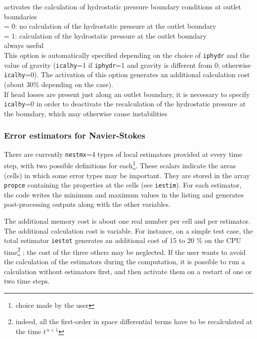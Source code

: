 {activates the calculation of hydrostatic pressure boundary conditions at outlet
boundaries\\
\hspace*{1.3cm}= 0: no calculation of the hydrostatic pressure at the outlet boundary\\
\hspace*{1.3cm}= 1: calculation of the hydrostatic pressure at the outlet boundary\\
always useful\\
This option is automatically specified depending on the
choice of {\tt iphydr} and the value of gravity
({\tt icalhy}=1 if {\tt iphydr}=1 and gravity is different from 0; otherwise
{\tt icalhy}=0). The activation of this option generates an additional
calculation cost (about 30\% depending on the case).\\
If head losses are present just along an outlet boundary, it is necessary to
specify {\tt icalhy}=0 in order to deactivate the recalculation of the hydrostatic
pressure at the boundary, which may otherwise cause instabilities}



\subsubsection{Error estimators for Navier-Stokes}

There are currently {\tt nestmx}=4 types of local estimators
provided at every time step, with two possible definitions for
each\footnote{choice made by the user}. These scalars indicate the areas
(cells) in which some error types may be important. They are
stored in the array {\tt propce} containing the properties at the cells (see
{\tt iestim}). For each estimator, the code writes the minimum and
maximum values in the listing and generates post-processing outputs along with
the other variables.

The additional memory cost is about one real number per cell and per
estimator. The additional calculation cost is variable. For instance, on a
simple test case, the total estimator {\tt iestot} generates an additional cost
of 15 to 20 $\%$ on the CPU time\footnote{indeed, all the first-order in
space differential terms have to be recalculated at the time $t^{\,n+1}$} ;
the cost of the three others may be neglected. If the user wants to
avoid the calculation of the estimators during the computation, it is
possible to run a calculation without estimators first, and then activate them on
a restart of one or two time steps.

